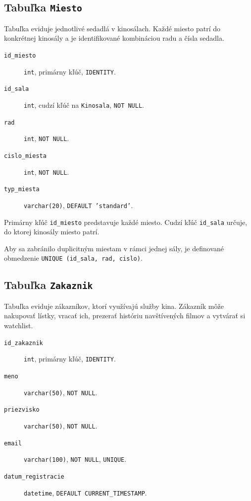 \documentclass[11pt, a4paper]{article}
\begin{document}
\subsection{Tabuľka \texttt{Miesto}}
Tabuľka eviduje jednotlivé sedadlá v kinosálach. Každé miesto patrí do konkrétnej
kinosály a je identifikované kombináciou radu a čísla sedadla.

\begin{description}
    \item[\texttt{id\_miesto}] \texttt{int}, primárny kľúč, \texttt{IDENTITY}.
    \item[\texttt{id\_sala}] \texttt{int}, cudzí kľúč na \texttt{Kinosala}, \texttt{NOT NULL}.
    \item[\texttt{rad}] \texttt{int}, \texttt{NOT NULL}.
    \item[\texttt{cislo\_miesta}] \texttt{int}, \texttt{NOT NULL}.
    \item[\texttt{typ\_miesta}] \texttt{varchar(20)}, \texttt{DEFAULT 'standard'}.
\end{description}

Primárny kľúč \texttt{id\_miesto} predstavuje každé miesto.
Cudzí kľúč \texttt{id\_sala} určuje, do ktorej kinosály miesto patrí.

Aby sa zabránilo duplicitným miestam v rámci jednej sály, je definované
obmedzenie \texttt{UNIQUE (id\_sala, rad, cislo)}.

\subsection{Tabuľka \texttt{Zakaznik}}
Tabuľka eviduje zákazníkov, ktorí využívajú služby kina. Zákazník môže nakupovať lístky,
vracať ich, prezerať históriu navštívených filmov a vytvárať si watchlist.

\begin{description}
    \item[\texttt{id\_zakaznik}] \texttt{int}, primárny kľúč, \texttt{IDENTITY}.
    \item[\texttt{meno}] \texttt{varchar(50)}, \texttt{NOT NULL}.
    \item[\texttt{priezvisko}] \texttt{varchar(50)}, \texttt{NOT NULL}.
    \item[\texttt{email}] \texttt{varchar(100)}, \texttt{NOT NULL}, \texttt{UNIQUE}.
    \item[\texttt{datum\_registracie}] \texttt{datetime}, \texttt{DEFAULT CURRENT\_TIMESTAMP}.
\end{description}
\end{document}
